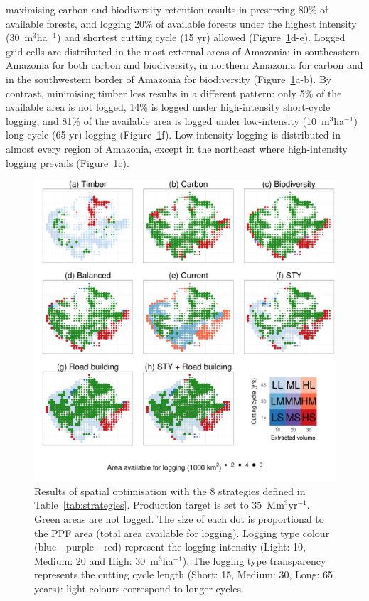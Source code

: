 \documentclass{article}
\begin{document}
maximising carbon and biodiversity retention results in preserving 80\% of available forests, and logging 20\% of available forests under the highest intensity (30~m$^3$ha$^{-1}$) and shortest cutting cycle (15 yr) allowed (Figure~\ref{fig:uniqueCost}d-e). Logged grid cells are distributed in the most external areas of Amazonia: in southeastern Amazonia for both carbon and biodiversity, in northern Amazonia for carbon and in the southwestern border of Amazonia for biodiversity (Figure~\ref{fig:uniqueCost}a-b). By contrast, minimising timber loss results in a different pattern: only 5\% of the available area is not logged, 14\% is logged under high-intensity short-cycle logging, and 81\% of the available area is logged under low-intensity (10~m$^3$ha$^{-1}$) long-cycle (65 yr) logging (Figure~\ref{fig:uniqueCost}f). Low-intensity logging is distributed in almost every region of Amazonia, except in the northeast where high-intensity logging prevails (Figure~\ref{fig:uniqueCost}c). 

\begin{figure}
    \centering
    \includegraphics[width=\linewidth]{graphs/mapsScenarios.pdf}
    \caption{Results of spatial optimisation with the 8 strategies defined in Table~\ref{tab:strategies}. Production target is set to 35~Mm$^3$yr$^{-1}$. Green areas are not logged. The size of each dot is proportional to the PPF area (total area available for logging). Logging type colour (blue - purple - red) represent the logging intensity (Light: 10, Medium: 20 and High: 30~m$^3$ha$^{-1}$). The logging type transparency represents the cutting cycle length (Short: 15, Medium: 30, Long: 65 years): light colours correspond to longer cycles.}
    \label{fig:uniqueCost}
    
\end{figure}
\end{document}
